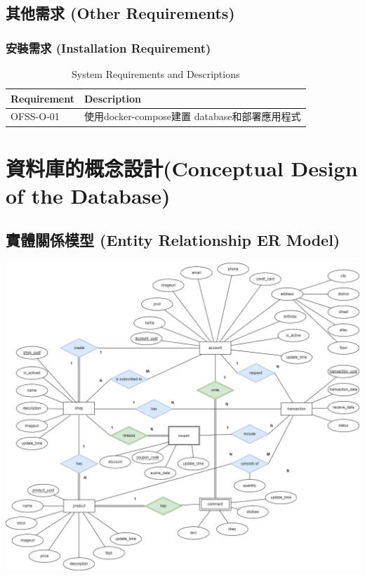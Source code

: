 \documentclass[a4paper, 12pt]{article}
\begin{document}
\subsection{其他需求 (Other Requirements)}
\subsubsection{安裝需求 (Installation Requirement)}
\begin{table}[h]
    \centering
    \renewcommand{\arraystretch}{1.35}
    \begin{tabular}{|p{3cm}|p{10cm}|}
        \hline
        \textbf{Requirement} & \textbf{Description} \\
        \hline
        OFSS-O-01 & 使用docker-compose建置 database和部署應用程式 \\
        \hline
    \end{tabular}
    \caption{System Requirements and Descriptions}
    \label{tab:system-requirements}
\end{table}

\newpage
\section{資料庫的概念設計(Conceptual Design of the Database)}
\subsection{實體關係模型 (Entity Relationship ER Model)}
\includegraphics[scale=0.35]{image/er_diagram.png}
\newpage
\end{document}
